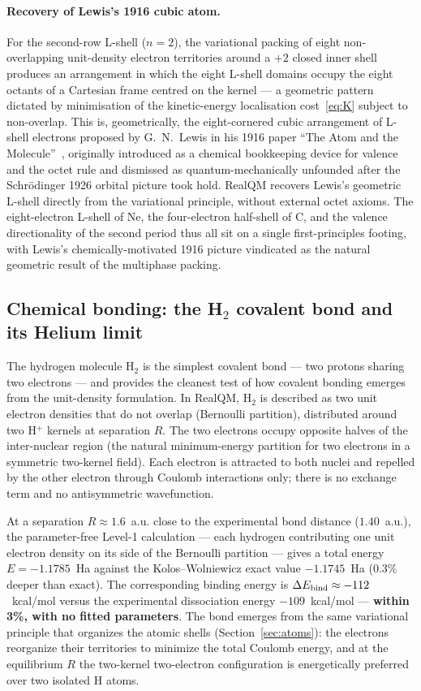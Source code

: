 \documentclass[11pt]{article}
\begin{document}
\paragraph{Recovery of Lewis's 1916 cubic atom.}
For the second-row L-shell ($n = 2$), the variational packing of eight non-overlapping unit-density electron territories around a $+2$ closed inner shell produces an arrangement in which the eight L-shell domains occupy the eight octants of a Cartesian frame centred on the kernel --- a geometric pattern dictated by minimisation of the kinetic-energy localisation cost~\eqref{eq:K} subject to non-overlap. This is, geometrically, the eight-cornered cubic arrangement of L-shell electrons proposed by G.~N.~Lewis in his 1916 paper ``The Atom and the Molecule''~\cite{Lewis1916}, originally introduced as a chemical bookkeeping device for valence and the octet rule and dismissed as quantum-mechanically unfounded after the Schr\"odinger 1926 orbital picture took hold. RealQM recovers Lewis's geometric L-shell directly from the variational principle, without external octet axioms. The eight-electron L-shell of Ne, the four-electron half-shell of C, and the valence directionality of the second period thus all sit on a single first-principles footing, with Lewis's chemically-motivated 1916 picture vindicated as the natural geometric result of the multiphase packing.

\subsection{Chemical bonding: the H$_2$ covalent bond and its Helium limit}\label{sec:h2bond}

The hydrogen molecule H$_2$ is the simplest covalent bond --- two protons sharing two electrons --- and provides the cleanest test of how covalent bonding emerges from the unit-density formulation. In RealQM, H$_2$ is described as two unit electron densities that do not overlap (Bernoulli partition), distributed around two H$^+$ kernels at separation $R$. The two electrons occupy opposite halves of the inter-nuclear region (the natural minimum-energy partition for two electrons in a symmetric two-kernel field). Each electron is attracted to both nuclei and repelled by the other electron through Coulomb interactions only; there is no exchange term and no antisymmetric wavefunction.

At a separation $R \approx 1.6$~a.u. close to the experimental bond distance ($1.40$~a.u.), the parameter-free Level-1 calculation --- each hydrogen contributing one unit electron density on its side of the Bernoulli partition --- gives a total energy $E = -1.1785$~Ha against the Kolos--Wolniewicz exact value $-1.1745$~Ha (0.3\% deeper than exact). The corresponding binding energy is $\Delta E_{\rm bind} \approx -112$~kcal/mol versus the experimental dissociation energy $-109$~kcal/mol --- \textbf{within 3\%, with no fitted parameters}. The bond emerges from the same variational principle that organizes the atomic shells (Section~\ref{sec:atoms}): the electrons reorganize their territories to minimize the total Coulomb energy, and at the equilibrium $R$ the two-kernel two-electron configuration is energetically preferred over two isolated H atoms.
\end{document}

